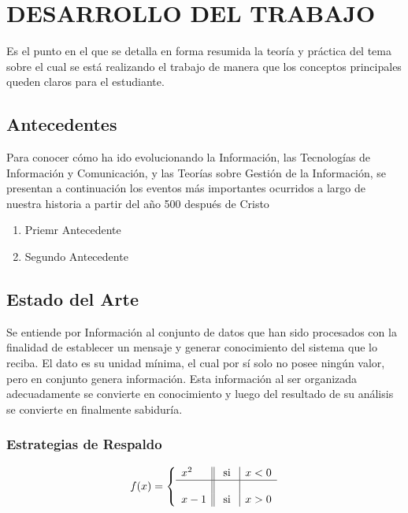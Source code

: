 \chapter{DESARROLLO DEL TRABAJO}
Es el punto en el que se detalla en forma resumida la teoría y práctica del tema sobre el cual se está realizando el trabajo de manera que los conceptos principales queden claros para el estudiante.

\section{Antecedentes}
Para conocer cómo ha ido evolucionando la Información, las Tecnologías de Información y Comunicación, y las Teorías sobre Gestión de la Información, se presentan a continuación los eventos m\'as importantes ocurridos a largo de nuestra historia a partir del año 500 después de Cristo

\begin{enumerate}
\item Priemr Antecedente
\item Segundo Antecedente
\end{enumerate}

\section{Estado del Arte}
Se entiende por Información al conjunto de datos que han sido procesados con la finalidad de establecer un mensaje y generar conocimiento del sistema que lo reciba. El dato es su unidad mínima, el cual por sí solo no posee ningún valor, pero en conjunto genera información. Esta información al ser organizada adecuadamente se convierte en conocimiento y luego del resultado de su análisis se convierte en finalmente sabiduría. 

\subsection{Estrategias de Respaldo}

\begin{equation}
f(x)= \left\{ \begin{array}{l||c|l}
x^2 & \mbox{ si } & x<0 \\ \hline
& & \\
x-1 & \mbox{ si } & x>0
\end{array}
\right.	
\end{equation}

